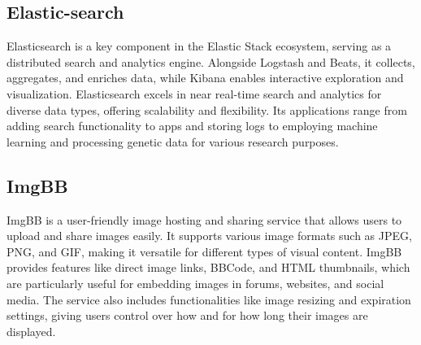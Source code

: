 \subsection{Elastic-search}

Elasticsearch is a key component in the Elastic Stack ecosystem, serving
as a distributed search and analytics engine. Alongside Logstash and
Beats, it collects, aggregates, and enriches data, while Kibana enables
interactive exploration and visualization. Elasticsearch excels in near
real-time search and analytics for diverse data types, offering
scalability and flexibility. Its applications range from adding search
functionality to apps and storing logs to employing machine learning and
processing genetic data for various research purposes.

\subsection{ImgBB}

ImgBB is a user-friendly image hosting and sharing service that allows users to upload and share images easily. It supports various image formats such as JPEG, PNG, and GIF, making it versatile for different types of visual content. ImgBB provides features like direct image links, BBCode, and HTML thumbnails, which are particularly useful for embedding images in forums, websites, and social media. The service also includes functionalities like image resizing and expiration settings, giving users control over how and for how long their images are displayed.
